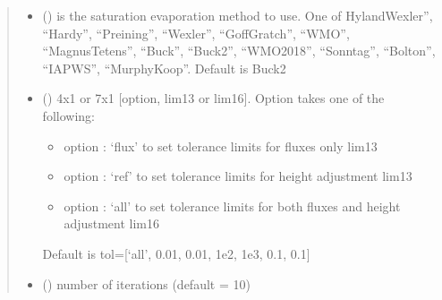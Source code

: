 \documentclass[letterpaper,10pt,english]{sphinxmanual}
\begin{document}
\begin{fulllineitems}
\begin{quote}
\begin{description}
\begin{itemize}
\begin{itemize}
\item {}
 = GF is removed from TSFs u10n, uref,

\item {}
 = GF=1 following ECMWF,

\item {}
 = following Zeng et al. 1998,

\item {}
 = following C35 matlab code;

\end{itemize}

\sphinxAtStartPar
’beta’ gustiness parameter, default is 1.2. ‘zi’ is PBL height {[}m{]} default is
600. ‘min’ is the value for gust speed in stable conditions {[}m/s{]}, default is
0.01 m/s.


\item {}
\sphinxAtStartPar
{} () \textendash{} is the saturation evaporation method to use. One of HylandWexler”, “Hardy”,
“Preining”, “Wexler”, “GoffGratch”, “WMO”, “MagnusTetens”, “Buck”, “Buck2”,
“WMO2018”, “Sonntag”, “Bolton”, “IAPWS”, “MurphyKoop”. Default is Buck2

\item {}
\sphinxAtStartPar
{} () \textendash{}
\sphinxAtStartPar
4x1 or 7x1 {[}option, lim1\sphinxhyphen{}3 or lim1\sphinxhyphen{}6{]}. Option takes one of the following:
\begin{itemize}
\item {}
\sphinxAtStartPar
option : ‘flux’ to set tolerance limits for fluxes only lim1\sphinxhyphen{}3

\item {}
\sphinxAtStartPar
option : ‘ref’ to set tolerance limits for height adjustment lim\sphinxhyphen{}1\sphinxhyphen{}3

\item {}
\sphinxAtStartPar
option : ‘all’ to set tolerance limits for both fluxes and height adjustment
lim1\sphinxhyphen{}6

\end{itemize}

\sphinxAtStartPar
Default is tol={[}‘all’, 0.01, 0.01, 1e\sphinxhyphen{}2, 1e\sphinxhyphen{}3, 0.1, 0.1{]}


\item {}
\sphinxAtStartPar
{} () \textendash{} number of iterations (default = 10)


\end{itemize}
\end{description}
\end{quote}
\end{fulllineitems}
\end{document}
